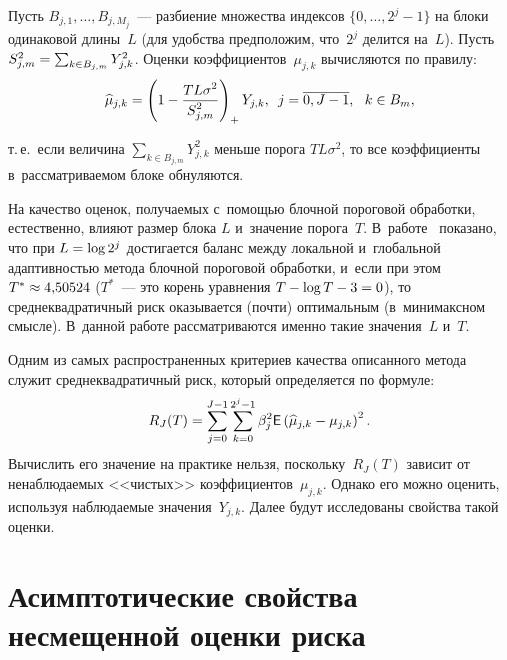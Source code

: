 \begin{multicols}{2}
Пусть $B_{j,1},\ldots,B_{j,M_j}$~--- разбиение множества индексов 
$\{0,\ldots,2^j-1\}$ на блоки одинаковой длины~$L$ (для удобства предположим, 
что~$2^j$ делится на~$L$). Пусть $S^2_{j,m}\hm=\sum\nolimits_{k\in 
B_{j,m}}Y^2_{j,k}$. Оценки коэффициентов~$\mu_{j,k}$ вычисляются по правилу:
\begin{equation*}
\widehat{\mu}_{j,k}=\left(1-\displaystyle\frac{\displaystyle TL\sigma^2\mathstrut}{\displaystyle S^2_{j,m}\mathstrut}\right)_+Y_{j,k},\enskip
j=\overline{0,J-1},\ \ k\in B_m,
\end{equation*}

\noindent
т.\,е.\ если величина $\sum\nolimits_{k\in B_{j,m}}Y^2_{j,k}$ меньше порога 
$TL\sigma^2$, то все коэффициенты в~рассматриваемом блоке обнуляются.

На качество оценок, получаемых с~помощью блочной пороговой обработки, 
естественно, влияют размер блока $L$ и~значение порога~$T$. В~работе~\cite{Cai99} показано, что при $L\hm=\log 2^j$ достигается баланс между локальной 
и~глобальной адап\-тив\-ностью метода блочной пороговой обработки, и~если при этом 
$T^*\hm\approx4{,}50524$ ($T^*$~--- это корень уравнения $T\hm-\log  T \hm-3\hm=0$), то 
сред\-не\-квад\-ра\-тич\-ный риск оказывается (почти) оптимальным (в~минимаксном смыс\-ле). 
В~данной работе рас\-смат\-ри\-ва\-ют\-ся именно такие значения~$L$ и~$T$.

Одним из самых распространенных критериев качества описанного метода служит 
среднеквадратичный риск, который определяется по формуле:
\begin{equation*}
R_J(T)=\sum\limits_{j=0}^{J-1}\sum\limits_{k=0}^{2^j-1}\beta^2_{j}{\sf E}\left(\widehat{\mu}_{j,k}-\mu_{j,k}\right)^2.
\end{equation*}
Вычислить его значение на практике нельзя, поскольку~$R_J(T)$ зависит от 
ненаблюдаемых <<чистых>> коэффициентов~$\mu_{j,k}$. Однако его можно оценить, 
используя наблюдаемые значения~$Y_{j,k}$. Далее будут исследованы свойства такой 
оценки.

\vspace*{-6pt}


\section{Асимптотические свойства несмещенной оценки риска}

\vspace*{-3pt}


\end{multicols}
